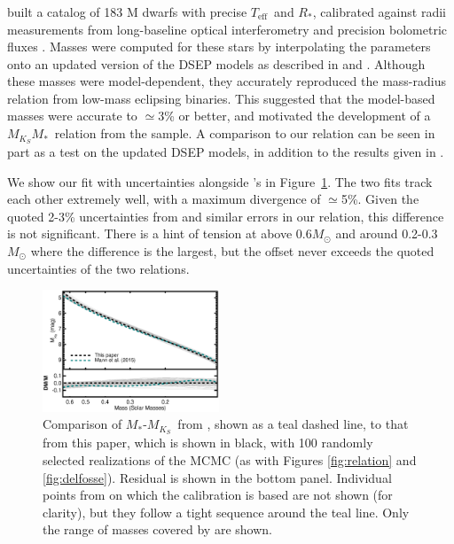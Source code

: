 \documentclass[twocolumn]{aastex62}
\newcommand\teff{\ensuremath{T_\text{eff}}}
\newcommand{\mks}{$M_{K_S}$}
\newcommand{\mmk}{$M_{K_S}$\textendash$M_*$}
\begin{document}
\subsubsection{\citet{Mann2015b}}

\citet{Mann2015b} built a catalog of 183 M dwarfs with precise \teff\ and $R_*$, calibrated against radii measurements from long-baseline optical interferometry \citep{Boyajian2012} and precision bolometric fluxes \citep[e.g.,][]{Mann2015a, 2015MNRAS.447..846B}. Masses were computed for these stars by interpolating the parameters onto an updated version of the DSEP models as described in \citet{Feiden2013,Feiden2014} and \citet{Muirhead2014}. Although these masses were model-dependent, they accurately reproduced the mass-radius relation from low-mass eclipsing binaries. This suggested that the model-based masses were accurate to $\simeq$3\% or better, and motivated the development of a \mmk\ relation from the \citet{Mann2015b} sample. A comparison to our relation can be seen in part as a test on the updated DSEP models, in addition to the results given in \citet{Mann2015b}. 

We show our fit with uncertainties alongside \citet{Mann2015b}'s in Figure~\ref{fig:mann}. The two fits track each other extremely well, with a maximum divergence of $\simeq$5\%. Given the quoted 2-3\% uncertainties from \citet{Mann2015b} and similar errors in our relation, this difference is not significant. There is a hint of tension at above 0.6$M_\odot$ and around 0.2-0.3$M_\odot$ where the difference is the largest, but the offset never exceeds the quoted uncertainties of the two relations.  

\begin{figure}[htb]
\begin{center}
\includegraphics[width=0.47\textwidth]{Mann_comp.eps}
\caption{Comparison of $M_*$-\mks\ from \citet{Mann2015b}, shown as a teal dashed line, to that from this paper, which is shown in black, with 100 randomly selected realizations of the MCMC (as with Figures \ref{fig:relation} and \ref{fig:delfosse}). Residual is shown in the bottom panel. Individual points from \citet{Mann2015b} on which the calibration is based are not shown (for clarity), but they follow a tight sequence around the teal line. Only the range of masses covered by \citet{Mann2015b} are shown. }
\label{fig:mann}
\end{center}
\end{figure}
\end{document}
